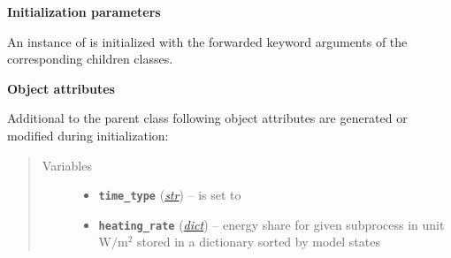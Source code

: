 \documentclass[a4paper,10pt,english]{sphinxmanual}
\begin{document}
\begin{fulllineitems}
\textbf{Initialization parameters}

An instance of  is initialized with the forwarded 
keyword arguments  of the corresponding children classes.

\textbf{Object attributes}

Additional to the parent class 
following object attributes are generated or modified during initialization:
\begin{quote}\begin{description}
\item[{Variables}] \leavevmode\begin{itemize}
\item {} 
\textbf{\texttt{time\_type}} (\href{http://docs.python.org/2.7/library/functions.html\#str}{\emph{str}}) -- is set to 

\item {} 
\textbf{\texttt{heating\_rate}} (\href{http://docs.python.org/2.7/library/stdtypes.html\#dict}{\emph{dict}}) -- energy share for given subprocess in unit 
\(\textrm{W}/ \textrm{m}^2\) stored 
in a dictionary sorted by model states

\end{itemize}

\end{description}\end{quote}

\end{fulllineitems}

\end{document}
